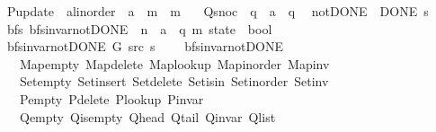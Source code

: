 \begin{isabellebody}
\ \ P{\isacharunderscore}{\kern0pt}update\ {\isacharcolon}{\kern0pt}{\isacharcolon}{\kern0pt}\ {\isachardoublequoteopen}{\isacharprime}{\kern0pt}a{\isacharcolon}{\kern0pt}{\isacharcolon}{\kern0pt}linorder\ {\isasymRightarrow}\ {\isacharprime}{\kern0pt}a\ {\isasymRightarrow}\ {\isacharprime}{\kern0pt}m\ {\isasymRightarrow}\ {\isacharprime}{\kern0pt}m{\isachardoublequoteclose}\ \isanewline
\ \ Q{\isacharunderscore}{\kern0pt}snoc\ {\isacharcolon}{\kern0pt}{\isacharcolon}{\kern0pt}\ {\isachardoublequoteopen}{\isacharprime}{\kern0pt}q\ {\isasymRightarrow}\ {\isacharprime}{\kern0pt}a\ {\isasymRightarrow}\ {\isacharprime}{\kern0pt}q{\isachardoublequoteclose}\ {\isacharplus}{\kern0pt}\isanewline
{}\ not{\isacharunderscore}{\kern0pt}DONE{\isacharcolon}{\kern0pt}\ {\isachardoublequoteopen}{\isasymnot}\ DONE\ s{\isachardoublequoteclose}\isanewline
%
\isadeliminvisible
\isanewline
%
\endisadeliminvisible
%
\isataginvisible
{}\isamarkupfalse%
\ {\isacharparenleft}{\kern0pt}\ bfs{\isacharparenright}{\kern0pt}\ bfs{\isacharunderscore}{\kern0pt}invar{\isacharunderscore}{\kern0pt}not{\isacharunderscore}{\kern0pt}DONE{\isacharprime}{\kern0pt}\ {\isacharcolon}{\kern0pt}{\isacharcolon}{\kern0pt}\ {\isachardoublequoteopen}{\isacharprime}{\kern0pt}n\ {\isasymRightarrow}\ {\isacharprime}{\kern0pt}a\ {\isasymRightarrow}\ {\isacharparenleft}{\kern0pt}{\isacharprime}{\kern0pt}q{\isacharcomma}{\kern0pt}\ {\isacharprime}{\kern0pt}m{\isacharparenright}{\kern0pt}\ state\ {\isasymRightarrow}\ bool{\isachardoublequoteclose}\ \isanewline
\ \ {\isachardoublequoteopen}bfs{\isacharunderscore}{\kern0pt}invar{\isacharunderscore}{\kern0pt}not{\isacharunderscore}{\kern0pt}DONE{\isacharprime}{\kern0pt}\ G\ src\ s\ {\isasymequiv}\isanewline
\ \ \ bfs{\isacharunderscore}{\kern0pt}invar{\isacharunderscore}{\kern0pt}not{\isacharunderscore}{\kern0pt}DONE\isanewline
\ \ \ \ Map{\isacharunderscore}{\kern0pt}empty\ Map{\isacharunderscore}{\kern0pt}delete\ Map{\isacharunderscore}{\kern0pt}lookup\ Map{\isacharunderscore}{\kern0pt}inorder\ Map{\isacharunderscore}{\kern0pt}inv\isanewline
\ \ \ \ Set{\isacharunderscore}{\kern0pt}empty\ Set{\isacharunderscore}{\kern0pt}insert\ Set{\isacharunderscore}{\kern0pt}delete\ Set{\isacharunderscore}{\kern0pt}isin\ Set{\isacharunderscore}{\kern0pt}inorder\ Set{\isacharunderscore}{\kern0pt}inv\isanewline
\ \ \ \ P{\isacharunderscore}{\kern0pt}empty\ P{\isacharunderscore}{\kern0pt}delete\ P{\isacharunderscore}{\kern0pt}lookup\ P{\isacharunderscore}{\kern0pt}invar\isanewline
\ \ \ \ Q{\isacharunderscore}{\kern0pt}empty\ Q{\isacharunderscore}{\kern0pt}is{\isacharunderscore}{\kern0pt}empty\ Q{\isacharunderscore}{\kern0pt}head\ Q{\isacharunderscore}{\kern0pt}tail\ Q{\isacharunderscore}{\kern0pt}invar\ Q{\isacharunderscore}{\kern0pt}list\isanewline

\end{isabellebody}
